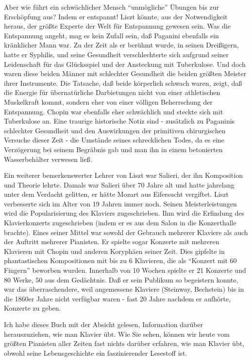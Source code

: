 Aber wie führt ein schwächlicher Mensch \enquote{unmögliche} Übungen bis zur Erschöpfung aus?
Indem er entspannt!
Liszt könnte, aus der Notwendigkeit heraus, der größte Experte der Welt für Entspannung gewesen sein.
Was die Entspannung angeht, mag es kein Zufall sein, daß Paganini ebenfalls ein kränklicher Mann war.
Zu der Zeit als er berühmt wurde, in seinen Dreißigern, hatte er Syphilis, und seine Gesundheit verschlechterte sich aufgrund seiner Leidenschaft für das Glücksspiel und der Ansteckung mit Tuberkulose.
Und doch waren diese beiden Männer mit schlechter Gesundheit die beiden größten Meister ihrer Instrumente.
Die Tatsache, daß beide körperlich schwach waren, zeigt, daß die Energie für übernatürliche Darbietungen nicht von einer athletischen Muskelkraft kommt, sondern eher von einer völligen Beherrschung der Entspannung.
Chopin war ebenfalls eher schwächlich und steckte sich mit Tuberkulose an.
Eine traurige historische Notiz sind - zusätzlich zu Paganinis schlechter Gesundheit und den Auswirkungen der primitiven chirurgischen Versuche dieser Zeit - die Umstände seines schrecklichen Todes, da es eine Verzögerung bei seinem Begräbnis gab und man ihn in einem betonierten Wasserbehälter verwesen ließ.

Ein weiterer bemerkenswerter Lehrer von Liszt war Salieri, der ihn Komposition und Theorie lehrte.
Damals war Salieri über 70 Jahre alt und hatte jahrelang unter dem Verdacht gelitten, er hätte Mozart aus Eifersucht vergiftet.
Liszt verbesserte sich im Alter von 19 Jahren immer noch.
Seinen Meisterleistungen wird die Popularisierung des Klaviers zugeschrieben.
Ihm wird die Erfindung des Klavierkonzerts zugeschrieben (indem er es aus dem Salon in die Konzerthalle brachte).
Eines seiner Mittel war sowohl der Gebrauch mehrerer Klaviere als auch der Auftritt mehrerer Pianisten.
Er spielte sogar Konzerte mit mehreren Klavieren mit Chopin und anderen Koryphäen seiner Zeit.
Dies gipfelte in phantastischen Kompositionen mit bis zu 6 Klavieren, die als \enquote{Konzert mit 60 Fingern} beworben wurden.
Innerhalb von 10 Wochen spielte er 21 Konzerte und 80 Werke, 50 aus dem Gedächtnis.
Daß er sein Publikum so begeistern konnte, war das überraschendere, weil angemessene Klaviere (Steinway, Bechstein) bis in die 1860er Jahre nicht verfügbar waren - fast 20 Jahre nachdem er aufhörte, Konzerte zu geben.

Ich habe dieses Buch mit der Absicht gelesen, Information darüber herauszuziehen, wie man Klavier übt.
 Wie Sie sehen, können wir heute vom größten Pianisten aller Zeiten fast nichts darüber erfahren,
 wie man Klavier übt, obwohl seine Lebensgeschichte ein faszinierender Lesestoff ist.



